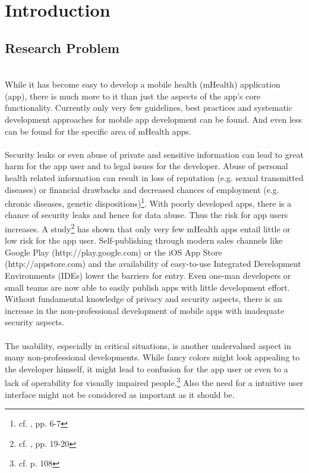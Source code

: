 \section{Introduction}

\subsection{Research Problem}
\\
While it has become easy to develop a mobile health (mHealth) application (app), there is much more to it than just the aspects of the app's core functionality. Currently only very few guidelines, best practices and systematic development approaches for mobile app development can be found. And even less can be found for the specific area of mHealth apps.
\\
\\
Security leaks or even abuse of private and sensitive information can lead to great harm for the app user and to legal issues for the developer. Abuse of personal health related information can result in loss of reputation (e.g. sexual transmitted diseases) or financial drawbacks and decreased chances of employment (e.g. chronic diseases, genetic dispositions)\footnote{cf. \cite{Dehling.2013}, pp. 6-7}. With poorly developed apps, there is a chance of security leaks and hence for data abuse. Thus the risk for app users increases. A study\footnote{cf. \cite{Njie.2013}, pp. 19-20} has shown that only very few mHealth apps entail little or low risk for the app user. Self-publishing through modern sales channels like Google Play (http://play.google.com) or the iOS App Store (http://appstore.com) and the availability of easy-to-use Integrated Development Environments (IDEs) lower the barriers for entry. Even one-man developers or small teams are now able to easily publish apps with little development effort. Without fundamental knowledge of privacy and security aspects, there is an increase in the non-professional development of mobile apps with inadequate security aspects.
\\
\\
The usability, especially in critical situations, is another undervalued aspect in many non-professional developments. While fancy colors might look appealing to the developer himself, it might lead to confusion for the app user or even to a lack of operability for visually impaired people.\footnote{cf. \cite{Badashian.2008} p. 108} Also the need for a intuitive user interface might not be considered as important as it should be.
